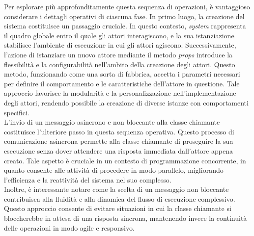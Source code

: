 Per esplorare più approfonditamente questa sequenza di operazioni, è vantaggioso considerare i dettagli operativi di ciascuna fase. 
In primo luogo, la creazione del sistema costituisce un passaggio cruciale. In questo contesto, \textit{system} rappresenta il quadro globale entro il quale gli attori interagiscono, e la sua istanziazione stabilisce l'ambiente di esecuzione in cui gli attori agiscono.
Successivamente, l'azione di istanziare un nuovo attore mediante il metodo \textit{props} introduce la flessibilità e la configurabilità nell'ambito della creazione degli attori.
Questo metodo, funzionando come una sorta di fabbrica, accetta i parametri necessari per definire il comportamento e le caratteristiche dell'attore in questione.
Tale approccio favorisce la modularità e la personalizzazione nell'implementazione degli attori, rendendo possibile la creazione di diverse istanze con comportamenti specifici. \\
L'invio di un messaggio asincrono e non bloccante alla classe chiamante costituisce l'ulteriore passo in questa sequenza operativa.
Questo processo di comunicazione asincrona permette alla classe chiamante di proseguire la sua esecuzione senza dover attendere una risposta immediata dall'attore appena creato.
Tale aspetto è cruciale in un contesto di programmazione concorrente, in quanto consente alle attività di procedere in modo parallelo, migliorando l'efficienza e la reattività del sistema nel suo complesso. \\
Inoltre, è interessante notare come la scelta di un messaggio non bloccante contribuisca alla fluidità e alla dinamica del flusso di esecuzione complessivo.
Questo approccio consente di evitare situazioni in cui la classe chiamante si bloccherebbe in attesa di una risposta sincrona, mantenendo invece la continuità delle operazioni in modo agile e responsivo.

